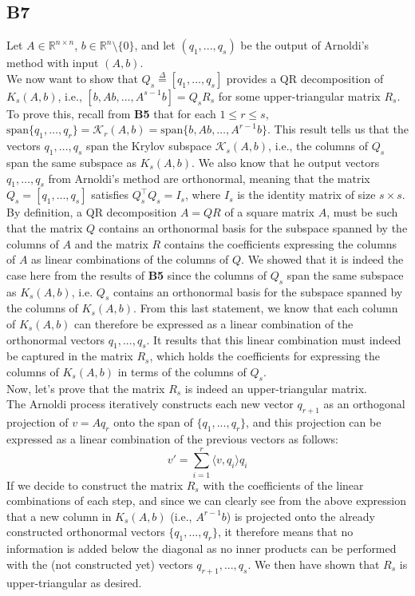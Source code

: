 \documentclass[a4paper,10pt]{article}
\begin{document}
\subsection*{B7}
Let $A \in \mathbb{R}^{n \times n}$, $b \in \mathbb{R}^n \setminus \{0\}$, and let $(q_1,...,q_s)$ be the output of Arnoldi's method with input $(A,b)$.\\
We now want to show that $Q_s \overset{\Delta}{=} [q_1,...,q_s]$ provides a QR decomposition of $K_s(A,b)$, i.e., $[b, Ab, \dots, A^{s-1}b] = Q_sR_s$ for some upper-triangular matrix $R_s$.\\

To prove this, recall from \textbf{B5} that for each \( 1 \leq r \leq s \), \( \text{span}\{q_1, \dots, q_r\} = \mathcal{K}_r(A, b) = \text{span}\{b, Ab, \dots, A^{r-1}b\} \). This result tells us that the vectors \( q_1, \dots, q_s \) span the Krylov subspace \( \mathcal{K}_s(A, b) \), i.e., the columns of \( Q_s \) span the same subspace as \( K_s(A, b) \). We also know that he output vectors \( q_1, \dots, q_s \) from Arnoldi’s method are orthonormal, meaning that the matrix \( Q_s = [q_1, ..., q_s] \) satisfies \( Q_s^\top Q_s = I_s \), where \( I_s \) is the identity matrix of size \( s \times s \).\\

By definition, a QR decomposition $A = QR$ of a square matrix $A$, must be such that the matrix \( Q \) contains an orthonormal basis for the subspace spanned by the columns of \( A\) and the matrix $R$ contains the coefficients expressing the columns of $A$ as linear combinations of the columns of $Q$. We showed that it is indeed the case here from the results of \textbf{B5} since the columns of $Q_s$ span the same subspace as \( K_s(A, b) \), i.e. $Q_s$ contains an orthonormal basis for the subspace spanned by the columns of $K_s(A,b)$. From this last statement, we know that each column of \( K_s(A, b) \) can therefore be expressed as a linear combination of the orthonormal vectors \( q_1, ..., q_s \). It results that this linear combination must indeed be captured in the matrix \( R_s \), which holds the coefficients for expressing the columns of \( K_s(A, b) \) in terms of the columns of \( Q_s \).\\

Now, let's prove that the matrix $R_s$ is indeed an upper-triangular matrix.\\
   The Arnoldi process iteratively constructs each new vector \( q_{r+1} \) as an orthogonal projection of \(v = A q_r \) onto the span of \( \{q_1, ..., q_r\} \), and this projection can be expressed as a linear combination of the previous vectors as follows:
   $$ v' = \sum_{i=1}^r \langle {v,q_i} \rangle q_i$$
   If we decide to construct the matrix \( R_s \) with the coefficients of the linear combinations of each step, and since we can clearly see from the above expression that a new column in \( K_s(A, b) \) (i.e., \( A^{r-1}b \)) is projected onto the already constructed orthonormal vectors \( \{q_1, ..., q_r\} \), it therefore means that no information is added below the diagonal as no inner products can be performed with the (not constructed yet) vectors $q_{r+1},...,q_s$. We then have shown that $R_s$ is upper-triangular as desired.\\
   
\end{document}
